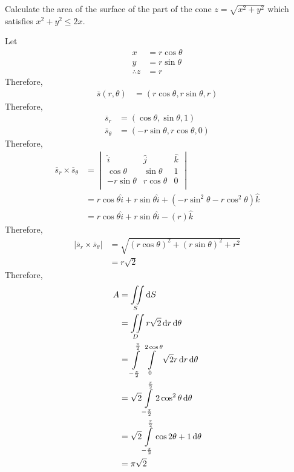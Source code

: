\documentclass[fleqn, a4paper, 12pt, twoside]{article}
\theoremstyle{definition}
\theoremstyle{theorem}
\begin{document}
\begin{question}
	Calculate the area of the surface of the part of the cone $z = \sqrt{x^2 + y^2}$ which satisfies $x^2 + y^2 \le 2 x$.
\end{question}

\begin{solution}
	Let
	\begin{align*}
		x            & = r \cos \theta \\
		y            & = r \sin \theta \\
		\therefore z & = r
	\end{align*}
	Therefore,
	\begin{align*}
		\overline{s}(r,\theta) & = (r \cos \theta , r \sin \theta , r)
	\end{align*}
	Therefore,
	\begin{align*}
		\overline{s}_r        & = (\cos \theta , \sin \theta , 1) \\
		\overline{s}_{\theta} & = (-r \sin \theta , r \cos \theta , 0)
	\end{align*}
	Therefore,
	\begin{align*}
		\overline{s}_r \times \overline{s}_{\theta} &=
			\begin{vmatrix}
				\hat{i}        & \hat{j}       & \hat{k} \\
				\cos \theta    & \sin \theta   & 1       \\
				-r \sin \theta & r \cos \theta & 0       \\
			\end{vmatrix}\\
			&= r \cos \theta \hat{i} + r \sin \theta \hat{i} + (-r \sin^2 \theta - r \cos^2 \theta) \hat{k}\\
			&= r \cos \theta \hat{i} + r \sin \theta \hat{i} - (r) \hat{k}
	\end{align*}
	Therefore,
	\begin{align*}
		\left| \overline{s}_r \times \overline{s}_{\theta} \right| & = \sqrt{(r \cos \theta)^2 + (r \sin \theta)^2 + r^2} \\
                                                                           & = r \sqrt{2}
	\end{align*}
	Therefore,
	\begin{align*}
		A & = \iint\limits_{S} \dif S                                                                                    \\
                  & = \iint\limits_{D} r \sqrt{2} \dif r \dif \theta                                                             \\
                  & = \int\limits_{-\frac{\pi}{2}}^{\frac{\pi}{2}} \int\limits_{0}^{2 \cos \theta} \sqrt{2} r \dif r \dif \theta \\
                  & = \sqrt{2} \int\limits_{-\frac{\pi}{2}}^{\frac{\pi}{2}} 2 \cos^2 \theta \dif \theta                          \\
                  & = \sqrt{2} \int\limits_{-\frac{\pi}{2}}^{\frac{\pi}{2}} \cos 2 \theta + 1 \dif \theta                        \\
                  & = \pi \sqrt{2}
	\end{align*}
\end{solution}
\end{document}
